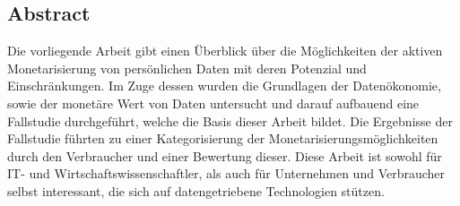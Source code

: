 \thispagestyle{empty}
\vspace*{5cm}
\begin{center}
\begin{minipage}{0.9\textwidth}
\chapter*{Abstract}

Die vorliegende Arbeit gibt einen Überblick über die Möglichkeiten der aktiven Monetarisierung von persönlichen Daten mit deren Potenzial und Einschränkungen. Im Zuge dessen wurden die Grundlagen der Datenökonomie, sowie der monetäre Wert von Daten untersucht und darauf aufbauend eine Fallstudie durchgeführt, welche die Basis dieser Arbeit bildet. Die Ergebnisse der Fallstudie führten zu einer Kategorisierung der Monetarisierungsmöglichkeiten durch den Verbraucher und einer Bewertung dieser. Diese Arbeit ist sowohl für IT- und Wirtschaftswissenschaftler, als auch für Unternehmen und Verbraucher selbst interessant, die sich auf datengetriebene Technologien stützen.

\vspace*{1.5cm}
\end{minipage}
\end{center}
\clearpage